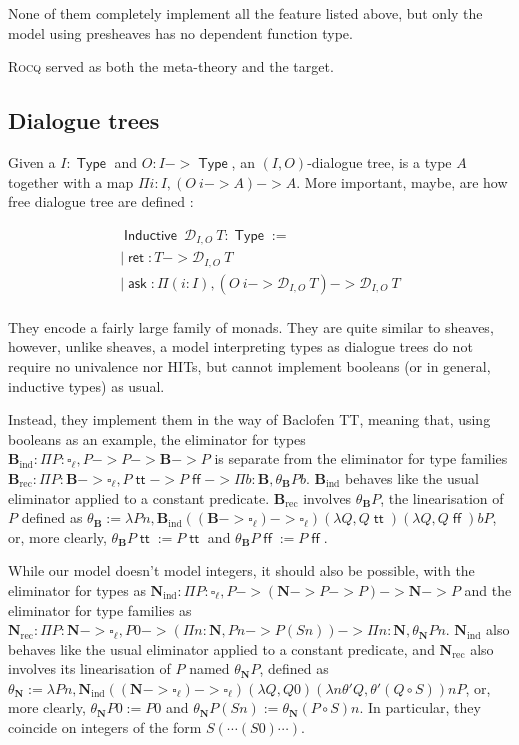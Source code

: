 \documentclass[11pt]{article}
\DeclareMathOperator{\Type}{\mathsf{Type}}
\DeclareMathOperator{\ask}{\mathsf{ask}}
\DeclareMathOperator{\Inductive}{\mathsf{Inductive}}
\DeclareMathOperator{\ret}{\mathsf{ret}}
\DeclareMathOperator{\rec}{rec}
\DeclareMathOperator{\ind}{ind}
\DeclareMathOperator{\true}{\mathsf{tt}}
\DeclareMathOperator{\false}{\mathsf{ff}}
\newcommand{\0}{\mathbf{0}}
\newcommand{\1}{\mathbf{1}}
\newcommand{\nat}{\mathbf{N}}
\newcommand{\bool}{\mathbf{B}}
\begin{document}
None of them completely implement all the feature listed above, but only the model using presheaves has no dependent function type.

\textsc{Rocq} served as both the meta-theory and the target.

\subsection{Dialogue trees}

Given a $I : \Type$ and $O : I -> \Type$, an $(I,O)$-dialogue tree, is a type $A$ together with a map $\Pi i : I, (O\ i-> A) -> A$. More important, maybe, are how free dialogue tree are defined : 

$$
\begin{array}{l}
    \Inductive\ \mathcal{D}_{I,O}\ T : \Type := \\
    | \ret : T -> \mathcal{D}_{I,O}\ T\\
    | \ask : \Pi (i : I),(O\ i -> \mathcal{D}_{I,O}\ T) -> \mathcal{D}_{I,O}\ T\\
\end{array}
$$

They encode a fairly large family of monads. They are quite similar to sheaves, however, unlike sheaves, a model interpreting types as dialogue trees do not require no univalence nor HITs, but cannot implement booleans (or in general, inductive types) as usual.

Instead, they implement them in the way of Baclofen TT, meaning that, using booleans as an example, the eliminator for types $\bool_{\ind} : \Pi P : \square_\ell, P -> P -> \bool -> P $ is separate from the eliminator for type families $\bool_{\rec} : \Pi P : \bool -> \square_\ell, P \true -> P \false -> \Pi b : \bool, \theta_\bool P b$. $\bool_{\ind}$ behaves like the usual eliminator applied to a constant predicate. $\bool_{\rec}$ involves $\theta_\bool P$, the linearisation of $P$ defined as $\theta_\bool:= \lambda P n, \bool_{\ind} ((\bool ->\square_\ell) -> \square_\ell) (\lambda Q, Q \true) (\lambda Q, Q \false) b P$, or, more clearly, $\theta_\bool P \true := P \true$ and $\theta_\bool P \false :=  P \false$.


While our model doesn't model integers, it should also be possible, with the eliminator for types as $\nat_{\ind} : \Pi P : \square_\ell, P -> (\nat ->P -> P) -> \nat -> P $ and the eliminator for type families as $\nat_{\rec} : \Pi P : \nat -> \square_\ell, P 0 -> (\Pi n :\nat, P n -> P (S n)) -> \Pi n : \nat, \theta_\nat P n$. $\nat_{\ind}$ also behaves like the usual eliminator applied to a constant predicate, and $\nat_{\rec}$ also involves its linearisation of $P$ named $\theta_\nat P$, defined as $\theta_\nat:= \lambda P n, \nat_{\ind} ((\nat ->\square_\ell) -> \square_\ell) (\lambda Q, Q 0) (\lambda n \theta' Q, \theta' (Q\circ S)) n P$, or, more clearly, $\theta_\nat P 0 := P 0$ and $\theta_\nat P (S n) := \theta_\nat (P\circ S) n$. In particular, they coincide on  integers of the form $S( \cdots (S 0)\cdots)$.
\end{document}
